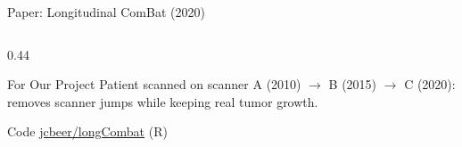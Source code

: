 \documentclass[aspectratio=169,xcolor=dvipsnames]{beamer}
\begin{document}
\begin{frame}{Paper: Longitudinal ComBat (2020)}
\begin{columns}
\begin{column}{0.44\textwidth}
            \begin{alertblock}{For Our Project}
                \small
                Patient scanned on scanner A (2010) $\to$ B (2015) $\to$ C (2020): removes scanner jumps while keeping real tumor growth.
            \end{alertblock}

            \begin{exampleblock}{\scriptsize {} Code}
                \scriptsize \href{https://github.com/jcbeer/longCombat}{jcbeer/longCombat} (R)
            \end{exampleblock}
        \end{column}
    \end{columns}
\end{frame}

\end{document}
